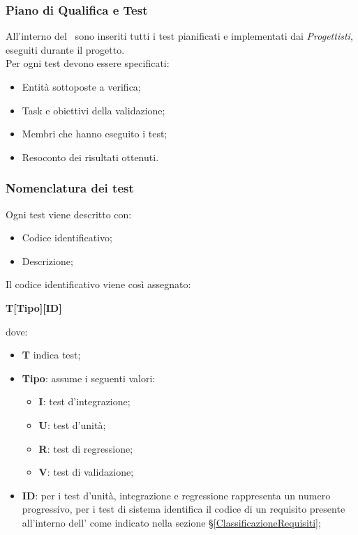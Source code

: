 \subsubsection{Piano di Qualifica e Test}
All'interno del \PdQ\ sono inseriti tutti i test pianificati e implementati dai \textit{Progettisti}, eseguiti durante il progetto.\\
Per ogni test devono essere specificati:
\begin{itemize}
	\item Entità sottoposte a verifica;
	\item Task e obiettivi della validazione;
	\item Membri che hanno eseguito i test;
	\item Resoconto dei risultati ottenuti.
\end{itemize}

\subsubsection{Nomenclatura dei test}
Ogni test viene descritto con:
\begin{itemize}
	\item Codice identificativo;
	\item Descrizione;
\end{itemize}
Il codice identificativo viene così assegnato:
\begin{center}
	\textbf{T[Tipo][ID]}
\end{center}
dove:
\begin{itemize}
	\item \textbf{T} indica test;
	\item\textbf{Tipo}: assume i seguenti valori:
	\begin{itemize}
		\item \textbf{I}: test d'integrazione;
		\item \textbf{U}: test d'unità;
		\item \textbf{R}: test di regressione;
		\item \textbf{V}: test di validazione;
	\end{itemize}
	\item \textbf{ID}: per i test d'unità, integrazione e regressione rappresenta un numero progressivo, per i test di sistema identifica il codice di un requisito presente all'interno dell'\AdRv{} come indicato nella sezione \S\ref{ClassificazioneRequisiti};
\end{itemize}